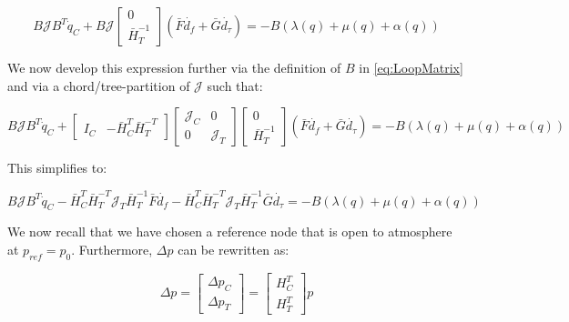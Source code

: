 \begin{equation}\label{eq:PressureFunctionKirchKNL}
	B\mathcal{J}B^T\dot{q}_C + B \mathcal{J} 
	\begin{bmatrix} 0 \\ \bar{H}_T^{-1} \end{bmatrix} (\bar{F} \dot{d_f} + \bar{G} \dot{d_{\tau}})
	= -B(\lambda(q) + \mu(q) + \alpha(q))
\end{equation}

We now develop this expression further via the definition of $B$ in \cref{eq:LoopMatrix} and via a chord/tree-partition of $\mathcal{J}$ such that:

\begin{equation}\label{eq:PressureFunctionKirchJPartitions}
	B\mathcal{J}B^T\dot{q}_C + 
	\begin{bmatrix}		I_C & -\bar{H}_C^T\bar{H}_T^{-T}	\end{bmatrix} 
	\begin{bmatrix}		\mathcal{J}_C & 0 \\ 0 & \mathcal{J}_T	\end{bmatrix} 
	\begin{bmatrix} 0 \\ \bar{H}_T^{-1} \end{bmatrix}  (\bar{F}  \dot{d_f} + \bar{G}  \dot{d_{\tau}})
	= -B(\lambda(q) + \mu(q) + \alpha(q))
\end{equation}

This simplifies to:

\begin{equation}\label{eq:PressureFunctionKirchJPartitionsSimp} %
	B\mathcal{J}B^T\dot{q}_C 
	-\bar{H}_C^T\bar{H}_T^{-T}\mathcal{J}_T\bar{H}_T^{-1} \bar{F} \dot{d_f} 
	-\bar{H}_C^T\bar{H}_T^{-T}\mathcal{J}_T\bar{H}_T^{-1} \bar{G} \dot{d_{\tau}}
	= -B(\lambda(q) + \mu(q) + \alpha(q))
\end{equation}

We now recall that we have chosen a reference node that is open to atmosphere at $p_{ref} = p_0$. Furthermore, $\Delta p$ can be rewritten as: 

\begin{equation}\label{eq:DeltaPPartition}
	\Delta p =
	\begin{bmatrix}		\Delta p_C \\ \Delta p_T	\end{bmatrix} = 
	\begin{bmatrix}		H_C^T \\ H_T^T	\end{bmatrix} p
\end{equation}

